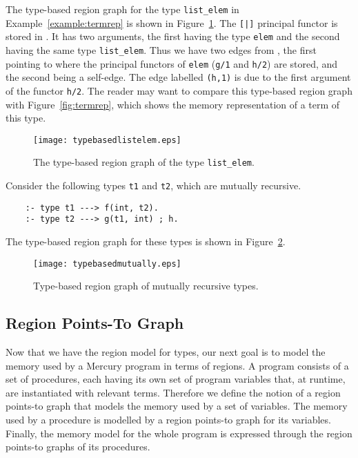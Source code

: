 \documentclass{tlp}
\newcommand{\code}[1]{{\tt#1}}
\begin{document}
\begin{example}
The type-based region graph for the type \code{list\_elem}
in Example~\ref{example:termrep}
is shown in Figure~\ref{fig:typebased:listelem}.
The \code{[|]} principal functor is stored in .
It has two arguments, the first having the type \code{elem} and
the second having the same type \code{list\_elem}.
Thus we have two edges from ,
the first pointing to  where the principal functors of
\code{elem} (\code{g/1} and \code{h/2}) are stored,
and the second being a self-edge.
The edge labelled \code{(h,1)} is due to the first argument of the functor
\code{h/2}.
The reader may want to compare this type-based region graph
with Figure~\ref{fig:termrep},
which shows the memory representation of a term of this type.
\begin{figure}[htp]
\centering
\texttt{[image: typebasedlistelem.eps]}
\caption{The type-based region graph of the type \code{list\_elem}.}
\label{fig:typebased:listelem}
\end{figure}
\hfill 
\label{example:typebasedrptg}
\end{example}
\begin{example}
Consider the following types \code{t1} and \code{t2},
which are mutually recursive.
\begin{verbatim}
    :- type t1 ---> f(int, t2).
    :- type t2 ---> g(t1, int) ; h.
\end{verbatim}
The type-based region graph for these types
is shown in Figure~\ref{fig:typebased:mutually}.
\begin{figure}[htp]
\centering
\texttt{[image: typebasedmutually.eps]}
\caption{Type-based region graph of mutually recursive types.}
\label{fig:typebased:mutually}
\end{figure}
\end{example}

\subsection{Region Points-To Graph}

Now that we have the region model for types,
our next goal is to model the memory used by a Mercury program
in terms of regions.
A program consists of a set of procedures,
each having its own set of program variables
that, at runtime, are instantiated with relevant terms.
Therefore we define the notion of a region points-to graph
that models the memory used by a set of variables.
The memory used by a procedure
is modelled by a region points-to graph for its variables.
Finally, the memory model for the whole program
is expressed through the region points-to graphs of its procedures.
\end{document}
